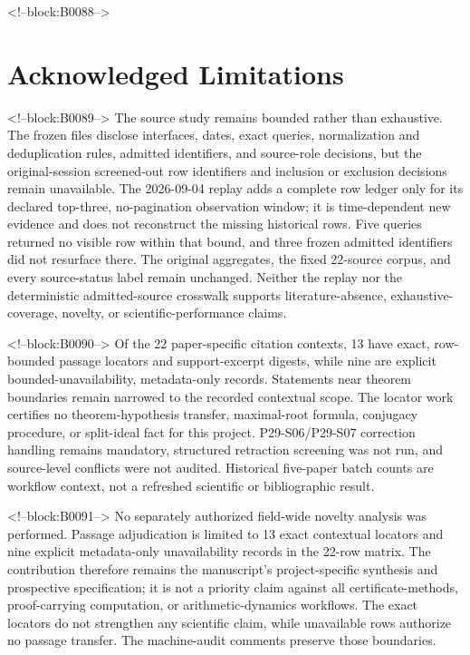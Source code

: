 \documentclass[11pt,a4paper]{article}
\begin{document}
<!--block:B0088-->
\section{Acknowledged Limitations}

<!--block:B0089-->
The source study remains bounded rather than exhaustive. The frozen files disclose interfaces, dates, exact queries, normalization and deduplication rules, admitted identifiers, and source-role decisions, but the original-session screened-out row identifiers and inclusion or exclusion decisions remain unavailable. The 2026-09-04 replay adds a complete row ledger only for its declared top-three, no-pagination observation window; it is time-dependent new evidence and does not reconstruct the missing historical rows. Five queries returned no visible row within that bound, and three frozen admitted identifiers did not resurface there. The original aggregates, the fixed 22-source corpus, and every source-status label remain unchanged. Neither the replay nor the deterministic admitted-source crosswalk supports literature-absence, exhaustive-coverage, novelty, or scientific-performance claims.

<!--block:B0090-->
Of the 22 paper-specific citation contexts, 13 have exact,
row-bounded passage locators and support-excerpt digests, while nine are explicit
bounded-unavailability, metadata-only records. Statements near theorem boundaries
remain narrowed to the recorded contextual scope. The locator work certifies no
theorem-hypothesis transfer, maximal-root formula, conjugacy procedure, or split-ideal
fact for this project. P29-S06/P29-S07 correction handling remains mandatory,
structured retraction screening was not run, and source-level conflicts were not
audited. Historical five-paper batch counts are workflow context, not a refreshed
scientific or bibliographic result.

<!--block:B0091-->
No separately authorized field-wide novelty analysis was
performed. Passage adjudication is limited to 13 exact contextual locators and nine
explicit metadata-only unavailability records in the 22-row matrix. The contribution
therefore remains the manuscript's project-specific synthesis and prospective
specification; it is not a priority claim against all certificate-methods,
proof-carrying computation, or arithmetic-dynamics workflows. The exact locators do
not strengthen any scientific claim, while unavailable rows authorize no passage
transfer. The machine-audit comments preserve those boundaries.
\end{document}
